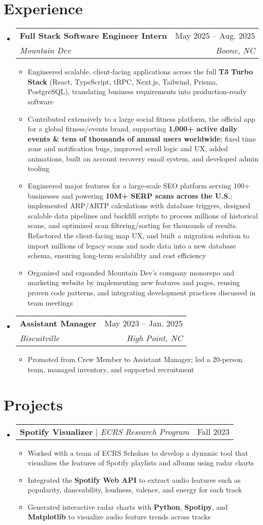 \documentclass[letterpaper,11pt]{article}
\makeatletter
\newcommand{\resumeItem}[1]{
  \item\small{
    {#1 \vspace{-2pt}}
  }
}
\newcommand{\resumeSubheading}[4]{
  \vspace{-2pt}\item
    \begin{tabular*}{0.97\textwidth}[t]{l@{\extracolsep{\fill}}r}
      \textbf{#1} & #2 \\
      \textit{\small#3} & \textit{\small #4} \\
    \end{tabular*}\vspace{-7pt}
}
\newcommand{\resumeProjectHeading}[2]{
    \item
    \begin{tabular*}{0.97\textwidth}{l@{\extracolsep{\fill}}r}
      \small#1 & #2 \\
    \end{tabular*}\vspace{-7pt}
}
\newcommand{\resumeSubHeadingListStart}{\begin{itemize}[leftmargin=0.15in, label={}]}
\newcommand{\resumeSubHeadingListEnd}{\end{itemize}}
\newcommand{\resumeItemListStart}{\begin{itemize}}
\newcommand{\resumeItemListEnd}{\end{itemize}\vspace{-5pt}}
\makeatother
\begin{document}
\section{Experience}
  \resumeSubHeadingListStart

    \resumeSubheading
  {\textbf{Full Stack Software Engineer Intern}}{May 2025 -- Aug. 2025}
  {Mountain Dev}{Boone, NC}
  \resumeItemListStart
    \resumeItem{Engineered scalable, client-facing applications across the full \textbf{T3 Turbo Stack} (React, TypeScript, tRPC, Next.js, Tailwind, Prisma, PostgreSQL), translating business requirements into production-ready software}
    \resumeItem{Contributed extensively to a large social fitness platform, the official app for a global fitness/events brand, supporting \textbf{1{,}000+ active daily events \& tens of thousands of annual users worldwide}; fixed time zone and notification bugs, improved scroll logic and UX, added animations, built an account recovery email system, and developed admin tooling}
    \resumeItem{Engineered major features for a large-scale SEO platform serving 100+ businesses and powering \textbf{10M+ SERP scans across the U.S.}; implemented ARP/ARTP calculations with database triggers, designed scalable data pipelines and backfill scripts to process millions of historical scans, and optimized scan filtering/sorting for thousands of results. Refactored the client-facing map UX, and built a migration solution to import millions of legacy scans and node data into a new database schema, ensuring long-term scalability and cost efficiency}
    \resumeItem{Organized and expanded Mountain Dev’s company monorepo and marketing website by implementing new features and pages, reusing proven code patterns, and integrating development practices discussed in team meetings}
  \resumeItemListEnd

    \resumeSubheading
      {\textbf{Assistant Manager}}{May 2023 -- Jan. 2025}
      {Biscuitville}{High Point, NC}
      \resumeItemListStart
        \resumeItem{Promoted from Crew Member to Assistant Manager; led a 20-person team, managed inventory, and supported recruitment}
      \resumeItemListEnd

  \resumeSubHeadingListEnd

\section{Projects}
  \resumeSubHeadingListStart         

    \resumeProjectHeading
      {\textbf{Spotify Visualizer} $|$ \emph{ECRS Research Program}}{Fall 2023}
      \resumeItemListStart
        \resumeItem{Worked with a team of ECRS Scholars to develop a dynamic tool that visualizes the features of Spotify playlists and albums using radar charts}
        \resumeItem{Integrated the \textbf{Spotify Web API} to extract audio features such as popularity, danceability, loudness, valence, and energy for each track}
        \resumeItem{Generated interactive radar charts with \textbf{Python}, \textbf{Spotipy}, and \textbf{Matplotlib} to visualize audio feature trends across tracks}
      \resumeItemListEnd
      
  \resumeSubHeadingListEnd
\end{document}
